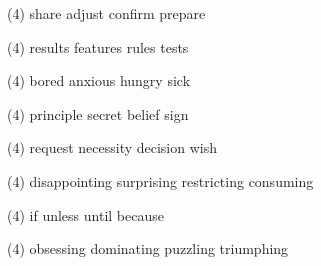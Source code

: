 \item
\begin{tasks}(4)
	\task share
	\task adjust
	\task confirm
	\task prepare
\end{tasks}
\item
\begin{tasks}(4)
	\task results
	\task features
	\task rules
	\task tests
\end{tasks}
\item
\begin{tasks}(4)
	\task bored
	\task anxious
	\task hungry
	\task sick
\end{tasks}
\item
\begin{tasks}(4)
	\task principle
	\task secret
	\task belief
	\task sign
\end{tasks}
\item
\begin{tasks}(4)
	\task request
	\task necessity
	\task decision
	\task wish
\end{tasks}
\item
\begin{tasks}(4)
	\task disappointing
	\task surprising
	\task restricting
	\task consuming
\end{tasks}
\item
\begin{tasks}(4)
	\task if
	\task unless
	\task until
	\task because
\end{tasks}
\item
\begin{tasks}(4)
	\task obsessing
	\task dominating
	\task puzzling
	\task triumphing
\end{tasks}